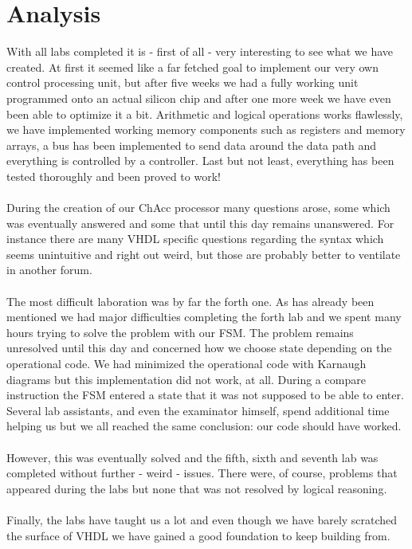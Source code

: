\documentclass[a4paper,11pt]{article}
\begin{document}
\newpage

\section{Analysis}
With all labs completed it is - first of all - very interesting to see what 
we have created. At first it seemed like a far fetched goal to implement our 
very own control processing unit, but after five weeks we had a fully 
working unit programmed onto an actual silicon chip and after one more week 
we have even been able to optimize it a bit. Arithmetic and logical 
operations works flawlessly, we have implemented working memory components 
such as registers and memory arrays, a bus has been implemented to send data 
around the data path and everything is controlled by a controller. Last but 
not least, everything has been tested thoroughly and been proved to work!\\\\
\noindent
During the creation of our ChAcc processor many questions arose, some which 
was eventually answered and some that until this day remains unanswered. For 
instance there are many VHDL specific questions regarding the syntax which 
seems unintuitive and right out weird, but those are probably better to 
ventilate in another forum.\\\\
\noindent
The most difficult laboration was by far the forth one. As has already been 
mentioned we had major difficulties completing the forth lab and we spent 
many hours trying to solve the problem with our FSM. The problem remains 
unresolved until this day and concerned how we choose state depending on the 
operational code. We had minimized the operational code with Karnaugh diagrams 
but this implementation did not work, at all. During a compare instruction 
the FSM entered a state that it was not supposed to be able to enter. Several 
lab assistants, and even the examinator himself, spend additional time helping 
us but we all reached the same conclusion: our code should have worked.\\\\
\noindent
However, this was eventually solved and the fifth, sixth and seventh lab 
was completed without further - weird - issues. There were, of course, problems 
that appeared during the labs but none that was not resolved by logical 
reasoning.\\\\
\noindent
Finally, the labs have taught us a lot and even though we have barely 
scratched the surface of VHDL we have gained a good foundation to keep 
building from.\\\\
\end{document}
